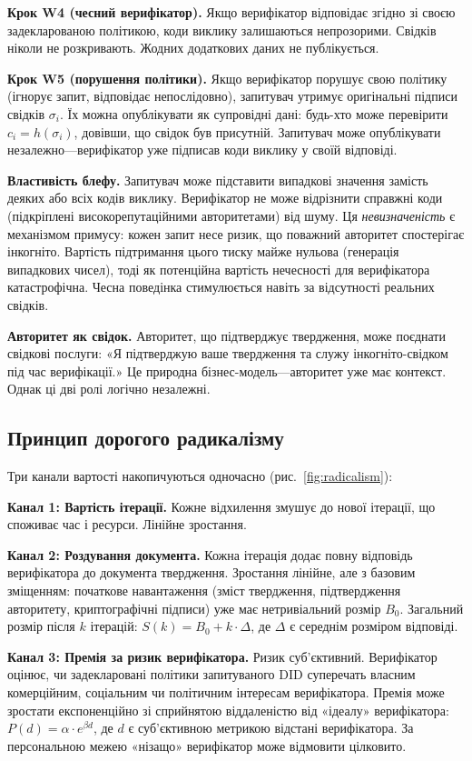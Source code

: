 \documentclass[11pt,a4paper,twocolumn]{article}
\begin{document}
\textbf{Крок W4 (чесний верифікатор).} Якщо верифікатор відповідає згідно зі своєю задекларованою політикою, коди виклику залишаються непрозорими. Свідків ніколи не розкривають. Жодних додаткових даних не публікується.

\textbf{Крок W5 (порушення політики).} Якщо верифікатор порушує свою політику (ігнорує запит, відповідає непослідовно), запитувач утримує оригінальні підписи свідків $\sigma_i$. Їх можна опублікувати як супровідні дані: будь-хто може перевірити $c_i = h(\sigma_i)$, довівши, що свідок був присутній. Запитувач може опублікувати незалежно---верифікатор уже підписав коди виклику у своїй відповіді.

\textbf{Властивість блефу.} Запитувач може підставити випадкові значення замість деяких або всіх кодів виклику. Верифікатор не може відрізнити справжні коди (підкріплені високорепутаційними авторитетами) від шуму. Ця \emph{невизначеність} є механізмом примусу: кожен запит несе ризик, що поважний авторитет спостерігає інкогніто. Вартість підтримання цього тиску майже нульова (генерація випадкових чисел), тоді як потенційна вартість нечесності для верифікатора катастрофічна. Чесна поведінка стимулюється навіть за відсутності реальних свідків.

\textbf{Авторитет як свідок.} Авторитет, що підтверджує твердження, може поєднати свідкові послуги: «Я підтверджую ваше твердження та служу інкогніто-свідком під час верифікації.» Це природна бізнес-модель---авторитет уже має контекст. Однак ці дві ролі логічно незалежні.

\subsection{Принцип дорогого радикалізму}

Три канали вартості накопичуються одночасно (рис.~\ref{fig:radicalism}):

\textbf{Канал 1: Вартість ітерації.} Кожне відхилення змушує до нової ітерації, що споживає час і ресурси. Лінійне зростання.

\textbf{Канал 2: Роздування документа.} Кожна ітерація додає повну відповідь верифікатора до документа твердження. Зростання лінійне, але з базовим зміщенням: початкове навантаження (зміст твердження, підтвердження авторитету, криптографічні підписи) уже має нетривіальний розмір $B_0$. Загальний розмір після $k$ ітерацій: $S(k) = B_0 + k \cdot \Delta$, де $\Delta$ є середнім розміром відповіді.

\textbf{Канал 3: Премія за ризик верифікатора.} Ризик суб'єктивний. Верифікатор оцінює, чи задекларовані політики запитуваного DID суперечать власним комерційним, соціальним чи політичним інтересам верифікатора. Премія може зростати експоненційно зі сприйнятою віддаленістю від «ідеалу» верифікатора: $P(d) = \alpha \cdot e^{\beta d}$, де $d$ є суб'єктивною метрикою відстані верифікатора. За персональною межею «нізащо» верифікатор може відмовити цілковито.
\end{document}
